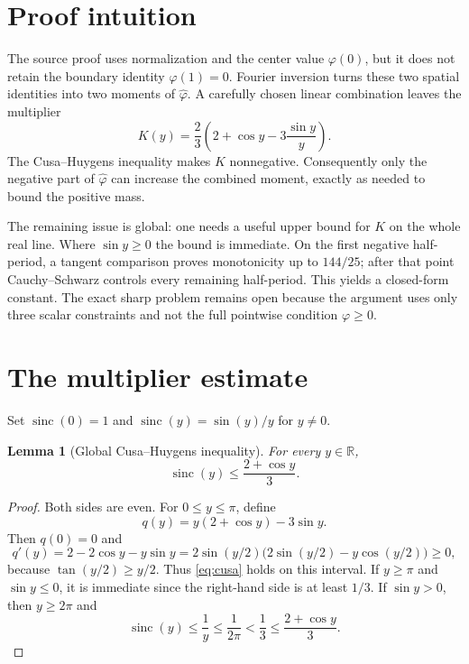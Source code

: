 \documentclass[11pt]{article}
\newtheorem{lemma}[theorem]{Lemma}
\newcommand{\R}{\mathbb R}
\newcommand{\sinc}{\operatorname{sinc}}
\begin{document}
\section{Proof intuition}

The source proof uses normalization and the center value $\varphi(0)$, but it
does not retain the boundary identity $\varphi(1)=0$. Fourier inversion turns
these two spatial identities into two moments of $\widehat\varphi$. A carefully
chosen linear combination leaves the multiplier
\[
 K(y)=\frac{2}{3}\left(2+\cos y-3\frac{\sin y}{y}\right).
\]
The Cusa--Huygens inequality makes $K$ nonnegative. Consequently only the
negative part of $\widehat\varphi$ can increase the combined moment, exactly
as needed to bound the positive mass.

The remaining issue is global: one needs a useful upper bound for $K$ on the
whole real line. Where $\sin y\ge0$ the bound is immediate. On the first
negative half-period, a tangent comparison proves monotonicity up to
$144/25$; after that point Cauchy--Schwarz controls every remaining
half-period. This yields a closed-form constant. The exact sharp problem
remains open because the argument uses only three scalar constraints and not
the full pointwise condition $\varphi\ge0$.

\section{The multiplier estimate}

Set $\sinc(0)=1$ and $\sinc(y)=\sin(y)/y$ for $y\ne0$.

\begin{lemma}[Global Cusa--Huygens inequality]\label{lem:cusa}
For every $y\in\R$,
\begin{equation}\label{eq:cusa}
             \sinc(y)\le \frac{2+\cos y}{3}.
\end{equation}
\end{lemma}

\begin{proof}
Both sides are even. For $0\le y\le\pi$, define
\[
 q(y)=y(2+\cos y)-3\sin y.
\]
Then $q(0)=0$ and
\[
 q'(y)=2-2\cos y-y\sin y
      =2\sin(y/2)\bigl(2\sin(y/2)-y\cos(y/2)\bigr)\ge0,
\]
because $\tan(y/2)\ge y/2$. Thus \eqref{eq:cusa} holds on this
interval. If $y\ge\pi$ and $\sin y\le0$, it is immediate since the
right-hand side is at least $1/3$. If $\sin y>0$, then $y\ge2\pi$ and
\[
 \sinc(y)\le\frac1y\le\frac1{2\pi}<\frac13
                    \le\frac{2+\cos y}{3}.
\]
\end{proof}
\end{document}

